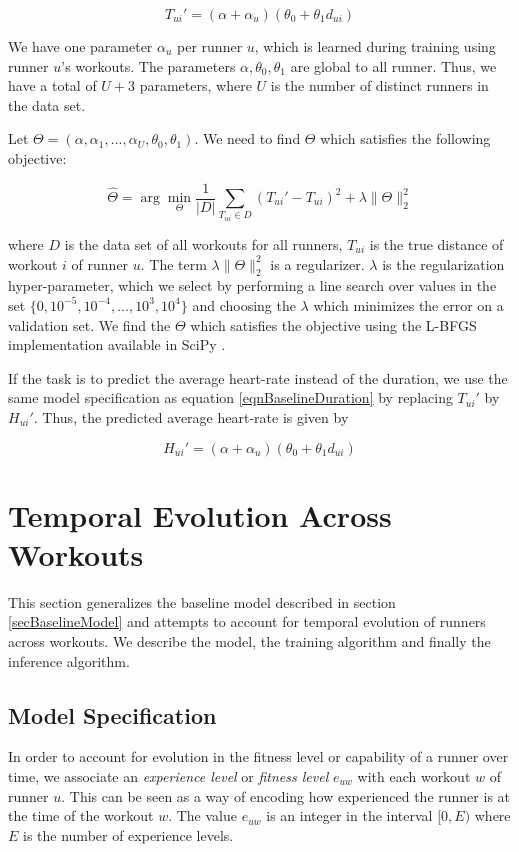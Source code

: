 \documentclass{acm_proc_article-sp}
\begin{document}
\begin{equation}
\label{eqnBaselineDuration}
T_{ui}' = (\alpha + \alpha_{u})(\theta_0 + \theta_1 d_{ui})
\end{equation}

We have one parameter $\alpha_u$ per runner $u$, which is learned during training using runner $u$'s workouts. The parameters $\alpha, \theta_0, \theta_1$ are global to all runner. Thus, we have a total of $U + 3$ parameters, where $U$ is the number of distinct runners in the data set. 

Let $\Theta = (\alpha, \alpha_1, ... , \alpha_U, \theta_0, \theta_1)$. We need to find $\Theta$ which satisfies the following objective:

$$\hat{\Theta} = \arg\min_{\Theta}\frac{1}{|D|} \sum_{T_{ui} \in D}(T_{ui}' - T_{ui})^2 + \lambda \|\Theta \|_2^2 $$

where $D$ is the data set of all workouts for all runners, $T_{ui}$ is the true distance of workout $i$ of runner $u$. The term $\lambda \|\Theta \|_2^2$ is a regularizer. $\lambda$ is the regularization hyper-parameter, which we select by performing a line search over values in the set $\{0, 10^{-5}, 10^{-4},...,10^3, 10^{4}\}$ and choosing the $\lambda$ which minimizes the error on a validation set. We find the $\Theta$ which satisfies the objective using the L-BFGS \cite{lbfgs} implementation available in SciPy \cite{scipy}.

If the task is to predict the average heart-rate instead of the duration, we use the same model specification as equation \ref{eqnBaselineDuration} by replacing $T_{ui}'$ by $H_{ui}'$. Thus, the predicted average heart-rate is given by

$$H_{ui}' = (\alpha + \alpha_{u})(\theta_0 + \theta_1 d_{ui})$$


\section{Temporal Evolution Across \\ Workouts}
\label{secTemporalModelUsers}
This section generalizes the baseline model described in section \ref{secBaselineModel} and attempts to account for temporal evolution of runners across workouts. We describe the model, the training algorithm and finally the inference algorithm.

\subsection{Model Specification}
In order to account for evolution in the fitness level or capability of a runner over time,  we associate an \emph{experience level} or \emph{fitness level} $e_{uw}$ with each workout $w$ of runner $u$. This can be seen as a way of encoding how experienced the runner is at the time of the workout $w$. The value $e_{uw}$ is an integer in the interval $[0, E)$ where $E$ is the number of experience levels. 
\end{document}
